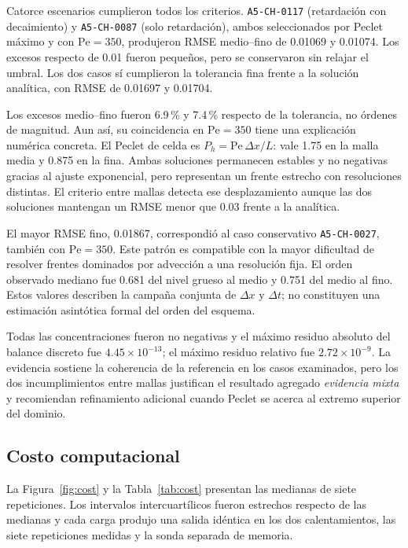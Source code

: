 \documentclass[11pt,a4paper]{article}
\newcommand{\code}[1]{\texttt{#1}}
\begin{document}
Catorce escenarios cumplieron todos los criterios. \code{A5-CH-0117}
(retardación con decaimiento) y \code{A5-CH-0087} (solo retardación), ambos
seleccionados por Peclet máximo y con $\mathrm{Pe}=350$, produjeron RMSE
medio--fino de 0.01069 y 0.01074. Los excesos respecto de 0.01 fueron pequeños,
pero se conservaron sin relajar el umbral. Los dos casos sí cumplieron la
tolerancia fina frente a la solución analítica, con RMSE de 0.01697 y 0.01704.

Los excesos medio--fino fueron 6.9\,\% y 7.4\,\% respecto de la tolerancia, no
órdenes de magnitud. Aun así, su coincidencia en $\mathrm{Pe}=350$ tiene una
explicación numérica concreta. El Peclet de celda es
$P_h=\mathrm{Pe}\,\Delta x/L$: vale 1.75 en la malla media y 0.875 en la fina.
Ambas soluciones permanecen estables y no negativas gracias al ajuste
exponencial, pero representan un frente estrecho con resoluciones distintas.
El criterio entre mallas detecta ese desplazamiento aunque las dos soluciones
mantengan un RMSE menor que 0.03 frente a la analítica.

El mayor RMSE fino, 0.01867, correspondió al caso conservativo
\code{A5-CH-0027}, también con $\mathrm{Pe}=350$. Este patrón es compatible con
la mayor dificultad de resolver frentes dominados por advección a una
resolución fija. El orden observado mediano fue 0.681 del nivel grueso al medio
y 0.751 del medio al fino. Estos valores describen la campaña conjunta de
$\Delta x$ y $\Delta t$; no constituyen una estimación asintótica formal del
orden del esquema.

Todas las concentraciones fueron no negativas y el máximo residuo absoluto del
balance discreto fue $4.45\times10^{-13}$; el máximo residuo relativo fue
$2.72\times10^{-9}$. La evidencia sostiene la coherencia
de la referencia en los casos examinados, pero los dos incumplimientos entre
mallas justifican el resultado agregado \emph{evidencia mixta} y recomiendan
refinamiento adicional cuando Peclet se acerca al extremo superior del dominio.

\subsection{Costo computacional}

La Figura~\ref{fig:cost} y la Tabla~\ref{tab:cost} presentan las medianas de
siete repeticiones. Los intervalos intercuartílicos fueron estrechos respecto
de las medianas y cada carga produjo una salida idéntica en los dos
calentamientos, las siete repeticiones medidas y la sonda separada de memoria.
\end{document}
